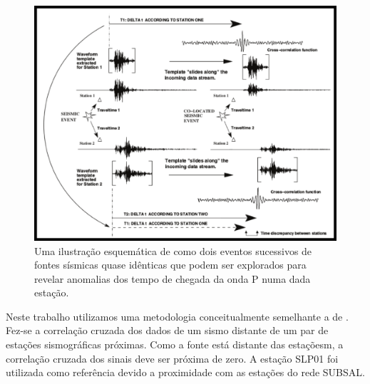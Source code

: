 \begin{figure}[!ht]
\centering
\includegraphics[scale=0.6]{Figs/correlacao_tempo_de_chegada.png}
\caption[Uma ilustração esquemática mostrando a correlação dos tempos de chegada da onda P.]{Uma ilustração esquemática de como dois eventos sucessivos de fontes sísmicas quase idênticas que podem ser explorados para revelar anomalias dos tempo de chegada da onda P numa dada estação. \cite{gibbons_identification_2006}}
\label{teste_tempo}
\end{figure}

Neste trabalho utilizamos uma metodologia conceitualmente semelhante a de \cite{gibbons_identification_2006}. Fez-se a correlação cruzada dos dados de um sismo distante de um par de estações sismográficas próximas. Como a fonte está distante das estaçõesm, a correlação cruzada dos sinais deve ser próxima de zero. A estação SLP01 foi utilizada como referência devido a proximidade com as estações do rede SUBSAL. 

